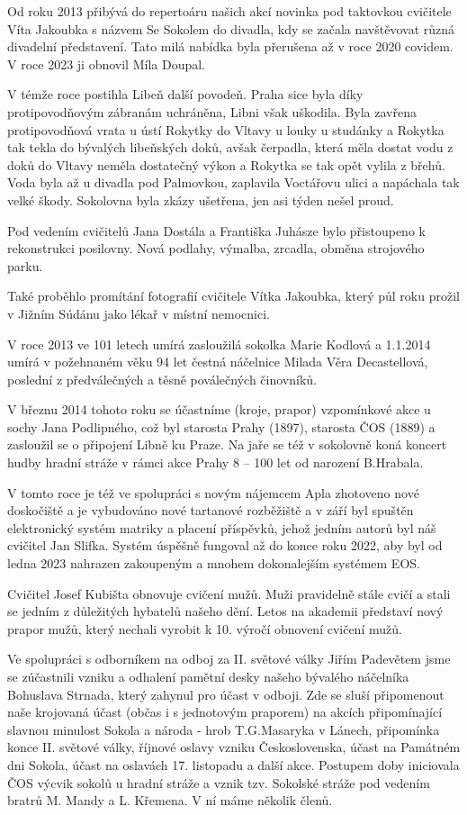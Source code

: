 Od roku 2013 přibývá do repertoáru našich akcí novinka pod taktovkou
cvičitele Víta Jakoubka s názvem Se Sokolem do divadla, kdy se začala
navštěvovat různá divadelní představení. Tato milá nabídka byla
přerušena až v roce 2020 covidem. V roce 2023 ji obnovil Míla Doupal.

V témže roce postihla Libeň další povodeň. Praha sice byla díky
protipovodňovým zábranám uchráněna, Libni však uškodila. Byla zavřena
protipovodňová vrata u ústí Rokytky do Vltavy u louky u studánky a
Rokytka tak tekla do bývalých libeňských doků, avšak čerpadla, která
měla dostat vodu z doků do Vltavy neměla dostatečný výkon a Rokytka se
tak opět vylila z břehů. Voda byla až u divadla pod Palmovkou, zaplavila
Voctářovu ulici a napáchala tak velké škody. Sokolovna byla zkázy
ušetřena, jen asi týden nešel proud.

Pod vedením cvičitelů Jana Dostála a Františka Juhásze bylo přistoupeno
k rekonstrukci posilovny. Nová podlahy, výmalba, zrcadla, obměna
strojového parku.

Také proběhlo promítání fotografií cvičitele Vítka Jakoubka, který půl
roku prožil v Jižním Súdánu jako lékař v místní nemocnici.

V roce 2013 ve 101 letech umírá zasloužilá sokolka Marie Kodlová a
1.1.2014 umírá v požehnaném věku 94 let čestná náčelnice Milada Věra
Decastellová, poslední z předválečných a těsně poválečných činovníků.

V březnu 2014 tohoto roku se účastníme (kroje, prapor) vzpomínkové akce
u sochy Jana Podlipného, což byl starosta Prahy (1897), starosta ČOS
(1889) a zasloužil se o připojení Libně ku Praze. Na jaře se též v
sokolovně koná koncert hudby hradní stráže v rámci akce Prahy 8 -- 100
let od narození B.Hrabala.

V tomto roce je též ve spolupráci s novým nájemcem Apla zhotoveno nové
doskočiště a je vybudováno nové tartanové rozběžiště a v září byl
spuštěn elektronický systém matriky a placení příspěvků, jehož jedním
autorů byl náš cvičitel Jan Slifka. Systém úspěšně fungoval až do konce
roku 2022, aby byl od ledna 2023 nahrazen zakoupeným a mnohem
dokonalejším systémem EOS.

Cvičitel Josef Kubišta obnovuje cvičení mužů. Muži pravidelně stále
cvičí a stali se jedním z důležitých hybatelů našeho dění. Letos na
akademii představí nový prapor mužů, který nechali vyrobit k 10. výročí
obnovení cvičení mužů.

Ve spolupráci s odborníkem na odboj za II. světové války Jiřím Padevětem
jsme se zúčastnili vzniku a odhalení pamětní desky našeho bývalého
náčelníka Bohuslava Strnada, který zahynul pro účast v odboji. Zde se
sluší připomenout naše krojovaná účast (občas i s jednotovým praporem)
na akcích připomínající slavnou minulost Sokola a národa - hrob
T.G.Masaryka v Lánech, připomínka konce II. světové války, říjnové
oslavy vzniku Československa, účast na Památném dni Sokola, účast na
oslavách 17. listopadu a další akce. Postupem doby iniciovala ČOS výcvik
sokolů u hradní stráže a vznik tzv. Sokolské stráže pod vedením bratrů
M. Mandy a L. Křemena. V ní máme několik členů.

